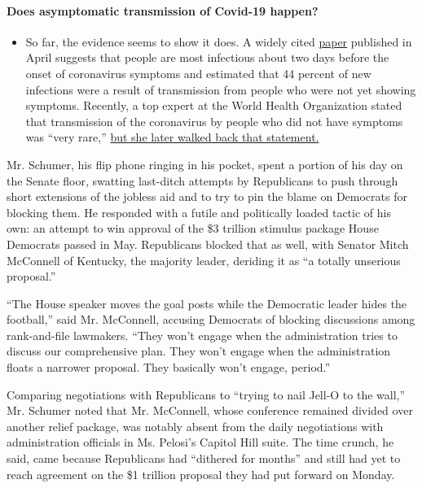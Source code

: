 \begin{itemize}
{  \paragraph{Does asymptomatic transmission of Covid-19
  happen?}\label{does-asymptomatic-transmission-of-covid-19-happen}}

  \begin{itemize}
  \tightlist
  \item
    So far, the evidence seems to show it does. A widely cited
    \href{https://www.nature.com/articles/s41591-020-0869-5}{paper}
    published in April suggests that people are most infectious about
    two days before the onset of coronavirus symptoms and estimated that
    44 percent of new infections were a result of transmission from
    people who were not yet showing symptoms. Recently, a top expert at
    the World Health Organization stated that transmission of the
    coronavirus by people who did not have symptoms was ``very rare,''
    \href{https://www.nytimes.com/2020/06/09/world/coronavirus-updates.html?action=click\&pgtype=Article\&state=default\&region=MAIN_CONTENT_3\&context=storylines_faq\#link-1f302e21}{but
    she later walked back that statement.}
  \end{itemize}
\end{itemize}

Mr. Schumer, his flip phone ringing in his pocket, spent a portion of
his day on the Senate floor, swatting last-ditch attempts by Republicans
to push through short extensions of the jobless aid and to try to pin
the blame on Democrats for blocking them. He responded with a futile and
politically loaded tactic of his own: an attempt to win approval of the
\$3 trillion stimulus package House Democrats passed in May. Republicans
blocked that as well, with Senator Mitch McConnell of Kentucky, the
majority leader, deriding it as ``a totally unserious proposal.''

``The House speaker moves the goal posts while the Democratic leader
hides the football,'' said Mr. McConnell, accusing Democrats of blocking
discussions among rank-and-file lawmakers. ``They won't engage when the
administration tries to discuss our comprehensive plan. They won't
engage when the administration floats a narrower proposal. They
basically won't engage, period.''

Comparing negotiations with Republicans to ``trying to nail Jell-O to
the wall,'' Mr. Schumer noted that Mr. McConnell, whose conference
remained divided over another relief package, was notably absent from
the daily negotiations with administration officials in Ms. Pelosi's
Capitol Hill suite. The time crunch, he said, came because Republicans
had ``dithered for months'' and still had yet to reach agreement on the
\$1 trillion proposal they had put forward on Monday.


